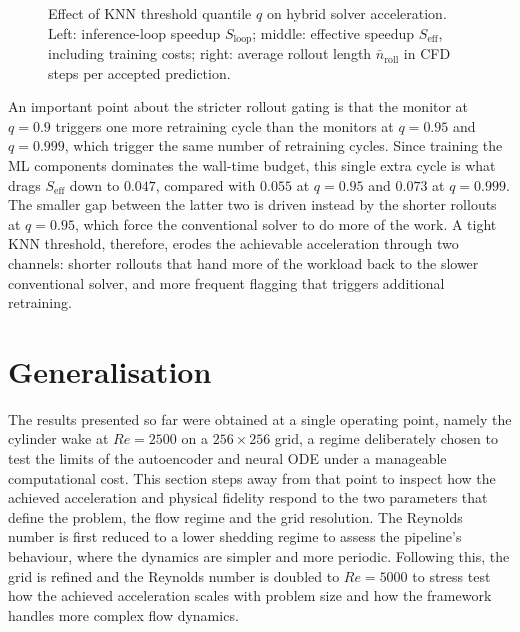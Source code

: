 \begin{figure}[htp]
  \caption{Effect of KNN threshold quantile $q$ on hybrid solver acceleration. Left: inference-loop speedup $S_\mathrm{loop}$; middle: effective speedup $S_\mathrm{eff}$, including training costs; right: average rollout length $\bar{n}_\mathrm{roll}$ in CFD steps per accepted prediction.}
  \label{fig: threshold_speedup}
\end{figure}

An important point about the stricter rollout gating is that the monitor at $q=0.9$ triggers one more retraining cycle than the monitors at $q=0.95$ and $q=0.999$, which trigger the same number of retraining cycles. Since training the ML components dominates the wall-time budget, this single extra cycle is what drags $S_\text{eff}$ down to $0.047$, compared with $0.055$ at $q=0.95$ and $0.073$ at $q=0.999$. The smaller gap between the latter two is driven instead by the shorter rollouts at $q=0.95$, which force the conventional solver to do more of the work. A tight KNN threshold, therefore, erodes the achievable acceleration through two channels: shorter rollouts that hand more of the workload back to the slower conventional solver, and more frequent flagging that triggers additional retraining.


\section{Generalisation}
\label{sect: 4_generalisation}
The results presented so far were obtained at a single operating point, namely the cylinder wake at $Re = 2500$ on a $256 \times 256$ grid, a regime deliberately chosen to test the limits of the autoencoder and neural ODE under a manageable computational cost. This section steps away from that point to inspect how the achieved acceleration and physical fidelity respond to the two parameters that define the problem, the flow regime and the grid resolution.  The Reynolds number is first reduced to a lower shedding regime to assess the pipeline's behaviour, where the dynamics are simpler and more periodic. Following this, the grid is refined and the Reynolds number is doubled to $Re=5000$ to stress test how the achieved acceleration scales with problem size and how the framework handles more complex flow dynamics. 

